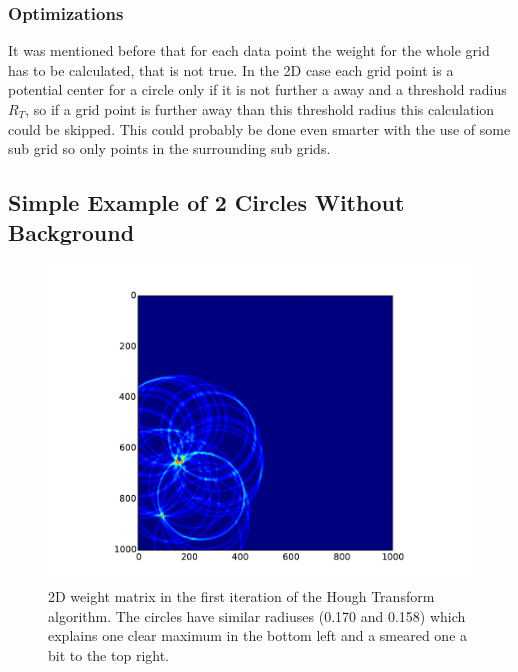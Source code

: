 \documentclass[11pt,twoside]{scrreprt}
\begin{document}
\subsubsection{Optimizations} %
\label{ssub:optimizations}
It was mentioned before that for each data point the weight for the whole grid has to be calculated, that is not true. In the 2D case each grid point is a potential center for a circle only if it is not further a away and a threshold radius $R_T$, so if a grid point is further away than this threshold radius this calculation could be skipped. This could probably be done even smarter with the use of some sub grid so only points in the surrounding sub grids.


\subsection{Simple Example of 2 Circles Without Background} %
\label{ssub:simple_example_of_2_circles_without_background}
\begin{figure}[hp]
  \centering
  \includegraphics[width=0.8\linewidth]{pics/2d_weights_01}
  \caption{2D weight matrix in the first iteration of the Hough Transform algorithm. The circles have similar radiuses (0.170 and 0.158) which explains one clear maximum in the bottom left and a smeared one a bit to the top right.}
  \label{fig:2d_weights_01}
\end{figure}
\end{document}
